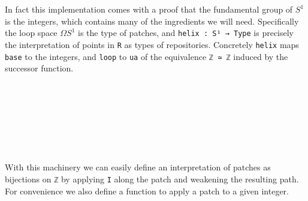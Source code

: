In fact this implementation comes with a proof that the fundamental group of $S^1$ is the integers,
which contains many of the ingredients we will need. Specifically the loop space $ΩS^1$ is the type
of patches, and \texttt{helix : S¹ → Type} is precisely the interpretation of points in \texttt{R} as
types of repositories. Concretely \texttt{helix} maps \texttt{base} to the integers, and \texttt{loop}
to \texttt{ua} of the equivalence \texttt{ℤ ≃ ℤ} induced by the successor function.
\begin{code}%
\>[0]\AgdaSpace{}%
\AgdaSpace{}%
\AgdaSpace{}%
\<%
\\
\>[0][@{}l@{\AgdaIndent{0}}]%
\>[2]\AgdaSymbol{(}\<%
\\
\>[2][@{}l@{\AgdaIndent{0}}]%
\>[4]\AgdaSpace{}%
\AgdaSpace{}%
\<%
\\
%
\>[2]\AgdaSymbol{;}\AgdaSpace{}%
\AgdaSpace{}%
\AgdaSpace{}%
\<%
\\
%
\>[2]\AgdaSymbol{;}\AgdaSpace{}%
\AgdaSpace{}%
\AgdaSpace{}%
\<%
\\
%
\>[2]\AgdaSymbol{;}\AgdaSpace{}%
\AgdaSpace{}%
\AgdaSpace{}%
\<%
\\
%
\>[2]\AgdaSymbol{;}\AgdaSpace{}%
\AgdaSpace{}%
\AgdaSpace{}%
\AgdaSymbol{)}\<%
\end{code}
With this machinery we can easily define an interpretation of patches as bijections on \texttt{ℤ}
by applying \texttt{I} along the patch and weakening the resulting path. For convenience we also
define a function to apply a patch to a given integer.
\begin{code}%
\>[0]\AgdaSpace{}%
\AgdaSymbol{:}\AgdaSpace{}%
\AgdaSpace{}%
\AgdaSpace{}%
\AgdaSpace{}%
\AgdaSpace{}%
\<%
\\
\>[0]\AgdaSpace{}%
\AgdaSpace{}%
\AgdaSymbol{=}\AgdaSpace{}%
\AgdaSpace{}%
\AgdaSymbol{(}\AgdaSpace{}%
\AgdaSpace{}%
\AgdaSymbol{)}\<%
\\
%
\\[\AgdaEmptyExtraSkip]%
\>[0]\AgdaSpace{}%
\AgdaSymbol{:}\AgdaSpace{}%
\AgdaSpace{}%
\AgdaSpace{}%
\AgdaSpace{}%
\AgdaSpace{}%
\<%
\\
\>[0]\AgdaSpace{}%
\AgdaSpace{}%
\AgdaSpace{}%
\AgdaSymbol{=}\AgdaSpace{}%
\AgdaSpace{}%
\AgdaSymbol{(}\AgdaSpace{}%
\AgdaSymbol{)}\AgdaSpace{}%
\<%
\end{code}

